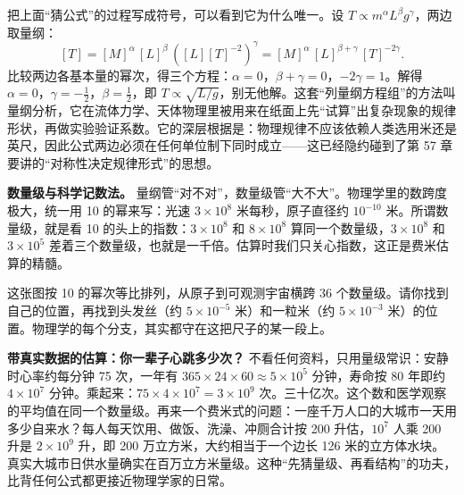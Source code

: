 \begin{mathbridge}
把上面“猜公式”的过程写成符号，可以看到它为什么唯一。设 $T \propto m^{\alpha} L^{\beta} g^{\gamma}$，两边取量纲：
\[
[T] = [M]^{\alpha}\, [L]^{\beta}\, \left([L][T]^{-2}\right)^{\gamma}
    = [M]^{\alpha}\, [L]^{\beta+\gamma}\, [T]^{-2\gamma}.
\]
比较两边各基本量的幂次，得三个方程：$\alpha = 0$，$\beta + \gamma = 0$，$-2\gamma = 1$。解得 $\alpha=0$，$\gamma=-\tfrac12$，$\beta=\tfrac12$，即 $T \propto \sqrt{L/g}$，别无他解。这套“列量纲方程组”的方法叫量纲分析，它在流体力学、天体物理里被用来在纸面上先“试算”出复杂现象的规律形状，再做实验验证系数。它的深层根据是：物理规律不应该依赖人类选用米还是英尺，因此公式两边必须在任何单位制下同时成立——这已经隐约碰到了第 57 章要讲的“对称性决定规律形式”的思想。
\end{mathbridge}

\textbf{数量级与科学记数法。} 量纲管“对不对”，数量级管“大不大”。物理学里的数跨度极大，统一用 10 的幂来写：光速 $3\times10^8$ 米每秒，原子直径约 $10^{-10}$ 米。所谓数量级，就是看 10 的头上的指数：$3\times10^8$ 和 $8\times10^8$ 算同一个数量级，$3\times10^8$ 和 $3\times10^5$ 差着三个数量级，也就是一千倍。估算时我们只关心指数，这正是费米估算的精髓。

\begin{center}
\end{center}

这张图按 10 的幂次等比排列，从原子到可观测宇宙横跨 36 个数量级。请你找到自己的位置，再找到头发丝（约 $5\times10^{-5}$ 米）和一粒米（约 $5\times10^{-3}$ 米）的位置。物理学的每个分支，其实都守在这把尺子的某一段上。

\textbf{带真实数据的估算：你一辈子心跳多少次？} 不看任何资料，只用量级常识：安静时心率约每分钟 75 次，一年有 $365\times24\times60 \approx 5\times10^5$ 分钟，寿命按 80 年即约 $4\times10^7$ 分钟。乘起来：$75 \times 4\times10^7 = 3\times10^9$ 次。三十亿次。这个数和医学观察的平均值在同一个数量级。再来一个费米式的问题：一座千万人口的大城市一天用多少自来水？每人每天饮用、做饭、洗澡、冲厕合计按 200 升估，$10^7$ 人乘 200 升是 $2\times10^9$ 升，即 200 万立方米，大约相当于一个边长 126 米的立方体水块。真实大城市日供水量确实在百万立方米量级。这种“先猜量级、再看结构”的功夫，比背任何公式都更接近物理学家的日常。


